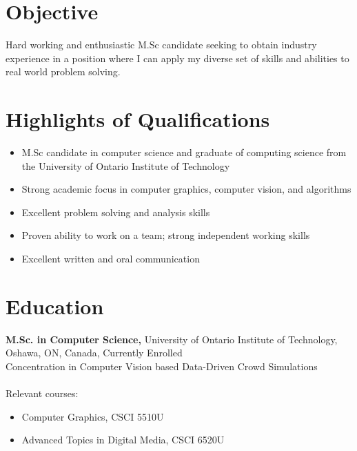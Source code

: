 \documentclass[margin]{res}
\begin{document}
 
 
 
\address{{\bf Present Address} \\ 918 King St. E \\ Oshawa, ON, Canada L1H 1H2  \\
        (289) 404-0333 (cell) }
\address{{\bf Permanent Address} \\ 30 Mitchell Ave. \\ Alliston, ON, Canada L9R 1C9 \\
        (705) 435-7416 }

 
\begin{resume} 
 
\section{Objective} 
Hard working and enthusiastic M.Sc candidate seeking to obtain industry experience in a position where I can apply my diverse set of skills and abilities to real world problem solving.

\section{Highlights of Qualifications}
\begin{itemize} \itemsep -2pt
\item M.Sc candidate in computer science and graduate of computing science from the University of Ontario Institute of Technology
\item Strong academic focus in computer graphics, computer vision, and algorithms
\item Excellent problem solving and analysis skills
\item Proven ability to work on a team; strong independent working skills
\item Excellent written and oral communication
\end{itemize}

\section{Education} 
{\bf M.Sc. in Computer Science,} University of Ontario Institute of Technology, \\
Oshawa, ON, Canada, Currently Enrolled \\
Concentration in Computer Vision based Data-Driven Crowd Simulations \\ \\
Relevant courses:
\begin{itemize} \itemsep -2pt
\item Computer Graphics, CSCI 5510U
\item Advanced Topics in Digital Media, CSCI 6520U
\end{itemize}


\end{resume}
\end{document}
